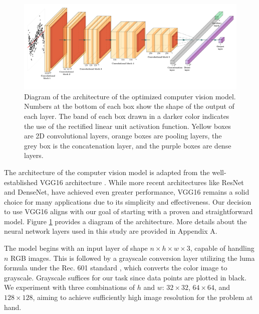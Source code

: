 \documentclass[]{interact}
\theoremstyle{plain}%
\theoremstyle{definition}
\theoremstyle{remark}
\begin{document}
\begin{figure}

{\centering \includegraphics[width=1\linewidth]{paper_files/figure-latex/cnn-diag-1} 

}

\caption{Diagram of the architecture of the optimized computer vision model. Numbers at the bottom of each box show the shape of the output of each layer. The band of each box drawn in a darker color indicates the use of the rectified linear unit activation function.  Yellow boxes are 2D convolutional layers, orange boxes are pooling layers, the grey box is the concatenation layer, and the purple boxes are dense layers.}\label{fig:cnn-diag}
\end{figure}

The architecture of the computer vision model is adapted from the
well-established VGG16 architecture \citep{simonyan2014very}. While more
recent architectures like ResNet \citep{he2016deep} and
DenseNet\citep{huang2017densely}, have achieved even greater
performance, VGG16 remains a solid choice for many applications due to
its simplicity and effectiveness. Our decision to use VGG16 aligns with
our goal of starting with a proven and straightforward model. Figure
\ref{fig:cnn-diag} provides a diagram of the architecture. More details
about the neural network layers used in this study are provided in
Appendix A.

The model begins with an input layer of shape
\(n \times h \times w \times 3\), capable of handling \(n\) RGB images.
This is followed by a grayscale conversion layer utilizing the luma
formula under the Rec. 601 standard \citep{series2011studio}, which
converts the color image to grayscale. Grayscale suffices for our task
since data points are plotted in black. We experiment with three
combinations of \(h\) and \(w\): \(32 \times 32\), \(64 \times 64\), and
\(128 \times 128\), aiming to achieve sufficiently high image resolution
for the problem at hand.
\end{document}

